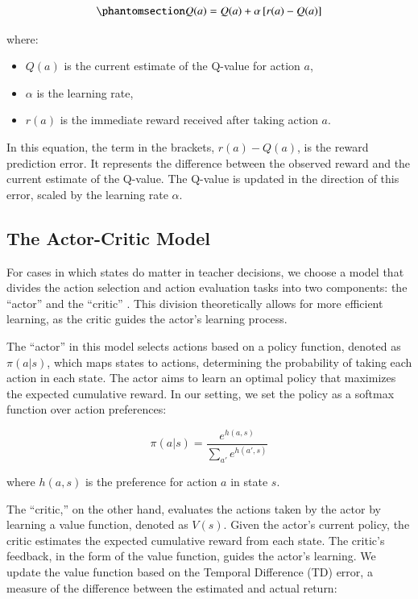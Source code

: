 \documentclass[
  number,
  preprint,
  3p,
  onecolumn]{elsarticle}
\begin{document}
\begin{equation}\phantomsection\label{eq-state-free}{
Q(a) = Q(a) + \alpha \left[ r(a) - Q(a) \right]
}\end{equation}

where:

\begin{itemize}
\item
  \(Q(a)\) is the current estimate of the Q-value for action \(a\),
\item
  \(\alpha\) is the learning rate,
\item
  \(r(a)\) is the immediate reward received after taking action \(a\).
\end{itemize}

In this equation, the term in the brackets, \(r(a) - Q(a)\), is the
reward prediction error. It represents the difference between the
observed reward and the current estimate of the Q-value. The Q-value is
updated in the direction of this error, scaled by the learning rate
\(\alpha\).

\subsection{The Actor-Critic Model}\label{the-actor-critic-model}

For cases in which states do matter in teacher decisions, we choose a
model that divides the action selection and action evaluation tasks into
two components: the ``actor'' and the ``critic'' \citep{sutton2018b}.
This division theoretically allows for more efficient learning, as the
critic guides the actor's learning process.

The ``actor'' in this model selects actions based on a policy function,
denoted as \(\pi(a|s)\), which maps states to actions, determining the
probability of taking each action in each state. The actor aims to learn
an optimal policy that maximizes the expected cumulative reward. In our
setting, we set the policy as a softmax function over action
preferences:

\[
\pi(a|s) = \frac{e^{h(a, s)}}{\sum_{a'} e^{h(a', s)}}
\]

where \(h(a, s)\) is the preference for action \(a\) in state \(s\).

The ``critic,'' on the other hand, evaluates the actions taken by the
actor by learning a value function, denoted as \(V(s)\). Given the
actor's current policy, the critic estimates the expected cumulative
reward from each state. The critic's feedback, in the form of the value
function, guides the actor's learning. We update the value function
based on the Temporal Difference (TD) error, a measure of the difference
between the estimated and actual return:
\end{document}
